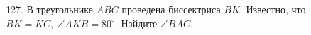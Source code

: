 127. В треугольнике $ABC$ проведена биссектриса $BK.$ Известно, что $BK=KC,\ \angle AKB=80^\circ.$ Найдите $\angle BAC.$\\
